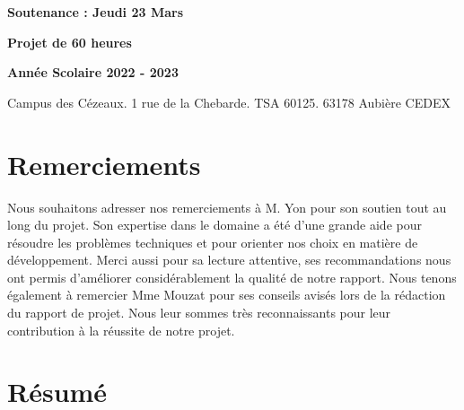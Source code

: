 \documentclass[12pt,french]{article}
\begin{document}
\begin{titlepage}
\begin{minipage}{.45\linewidth}
\begin{flushleft}
  			\textbf{Soutenance : Jeudi 23 Mars}
  		\end{flushleft}
  	\end{minipage}
  	\hfill
  	\begin{minipage}{.45\linewidth}
  		\begin{flushright}
  			\textbf{Projet de 60 heures}
  			
  			\textbf{Année Scolaire 2022 - 2023}
  		\end{flushright} 
  	\end{minipage}
  	
  	\vspace*{2cm} 
  	
    Campus des Cézeaux. 1 rue de la Chebarde. TSA 60125. 63178 Aubière CEDEX
    	

\end{titlepage}

\restoregeometry


\newpage

\vspace*{1cm}

\section*{Remerciements}

Nous souhaitons adresser nos remerciements à M. Yon pour son soutien tout au long du projet.
Son expertise dans le domaine a été d'une grande aide pour résoudre les problèmes techniques et pour orienter nos choix en matière de développement.
Merci aussi pour sa lecture attentive, ses recommandations nous ont permis d'améliorer considérablement la qualité de notre rapport.
Nous tenons également à remercier Mme Mouzat pour ses conseils avisés lors de la rédaction du rapport de projet.
Nous leur sommes très reconnaissants pour leur contribution à la réussite de notre projet.



\renewcommand{\listfigurename}{Table des illustrations}
\listoffigures

\newpage

\vspace*{1cm}

\section*{Résumé}
\end{document}
